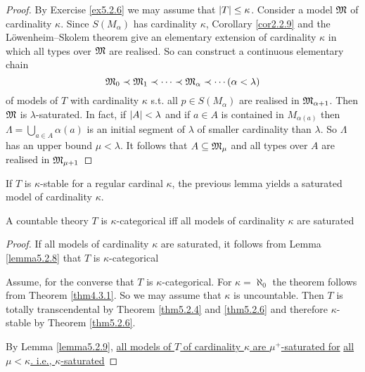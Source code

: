\documentclass[11pt]{article}
\begin{document}
\begin{proof}
By Exercise \ref{ex5.2.6} we may assume that \(\abs{T}\le\kappa\).  Consider a model \(\mathfrak{M}\) of cardinality
\(\kappa\). Since \(S(M_\alpha)\) has cardinality \(\kappa\), Corollary \ref{cor2.2.9} and the Löwenheim–Skolem theorem
give an elementary extension of cardinality \(\kappa\) in which all types over \(\mathfrak{M}\) are realised. So can
construct a continuous elementary chain
\begin{equation*}
\mathfrak{M}_0\prec\mathfrak{M}_1\prec\dots\prec\mathfrak{M}_\alpha\prec\cdots(\alpha<\lambda)
\end{equation*}
of models of \(T\) with cardinality \(\kappa\) s.t. all \(p\in S(M_\alpha)\) are realised in \(\mathfrak{M}_{\alpha+1}\).
Then \(\mathfrak{M}\) is \(\lambda\)-saturated. In fact, if \(\abs{A}<\lambda\) and if \(a\in A\) is contained in \(M_{\alpha(a)}\)
then \(\Lambda=\bigcup_{a\in A}\alpha(a)\) is an initial segment of \(\lambda\) of smaller cardinality than \(\lambda\).
So \(\Lambda\) has an upper bound \(\mu<\lambda\). It follows that \(A\subseteq\mathfrak{M}_\mu\) and all types over \(A\) are realised
in \(\mathfrak{M}_{\mu+1}\)
\end{proof}

\begin{remark}
\label{re5.2.10}
If \(T\) is \(\kappa\)-stable for a regular cardinal \(\kappa\), the previous lemma yields a saturated model of
cardinality \(\kappa\).
\end{remark}

\begin{theorem}[]
\label{thm5.2.11}
A countable theory \(T\) is \(\kappa\)-categorical iff all models of cardinality \(\kappa\) are saturated
\end{theorem}

\begin{proof}
If all models of cardinality \(\kappa\) are saturated, it follows from Lemma \ref{lemma5.2.8} that \(T\) is
\(\kappa\)-categorical

Assume, for the converse that \(T\) is \(\kappa\)-categorical. For \(\kappa=\aleph_0\) the theorem follows from
Theorem \ref{thm4.3.1}. So we may assume that \(\kappa\) is uncountable. Then \(T\) is totally
transcendental by Theorem \ref{thm5.2.4} and \ref{thm5.2.6} and therefore \(\kappa\)-stable by Theorem
\ref{thm5.2.6}.

By Lemma \ref{lemma5.2.9}, \uline{all models of \(T\) of cardinality \(\kappa\) are \(\mu^+\)-saturated for}
\uline{all \(\mu<\kappa\). i.e., \(\kappa\)-saturated}
\end{proof}
\end{document}
